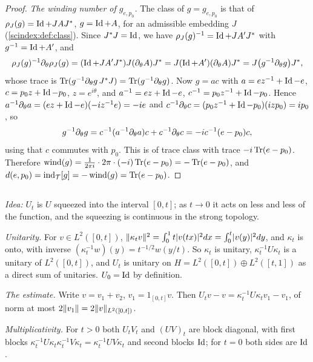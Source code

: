 \begin{proof}
  \emph{The winding number of $g_{e,p_0}$.} The class of $g=g_{e,p_0}$ is that of
  $\rho_J(g)=\operatorname{Id}+JAJ^*$, $g=\operatorname{Id}+A$, for an admissible embedding $J$
  (\cref{scindex:def:class}). Since $J^*J=\operatorname{Id}$, we have $\rho_J(g)^{-1}=\operatorname{Id}+JA'J^*$
  with $g^{-1}=\operatorname{Id}+A'$, and
  \begin{equation*}
    \rho_J(g)^{-1}\partial_\theta\rho_J(g)=(\operatorname{Id}+JA'J^*)J(\partial_\theta A)J^*=
    J(\operatorname{Id}+A')(\partial_\theta A)J^*=J\bigl(g^{-1}\partial_\theta g\bigr)J^*,
  \end{equation*}
  whose trace is $\operatorname{Tr}(g^{-1}\partial_\theta g\,J^*J)=\operatorname{Tr}(g^{-1}\partial_\theta g)$. Now
  $g=ac$ with $a=ez^{-1}+\operatorname{Id}-e$, $c=p_0z+\operatorname{Id}-p_0$, $z=e^{i\theta}$, and
  $a^{-1}=ez+\operatorname{Id}-e$, $c^{-1}=p_0z^{-1}+\operatorname{Id}-p_0$. Hence
  $a^{-1}\partial_\theta a=(ez+\operatorname{Id}-e)(-iz^{-1}e)=-ie$ and $c^{-1}\partial_\theta c=
  (p_0z^{-1}+\operatorname{Id}-p_0)(izp_0)=ip_0$, so
  \begin{equation*}
    g^{-1}\partial_\theta g=c^{-1}(a^{-1}\partial_\theta a)c+c^{-1}\partial_\theta c
    =-ic^{-1}(e-p_0)c,
  \end{equation*}
  using that $c$ commutes with $p_0$. This is of trace class with trace
  $-i\operatorname{Tr}(e-p_0)$. Therefore $\operatorname{wind}(g)=\frac1{2\pi i}\cdot2\pi\cdot(-i)\operatorname{Tr}(e-p_0)
  =-\operatorname{Tr}(e-p_0)$, and $d(e,p_0)=\operatorname{ind}_{\mathcal T}[g]=-\operatorname{wind}(g)=\operatorname{Tr}(e-p_0)$.
\end{proof}

\subsection*{}

\emph{Idea:} $U_t$ is $U$ squeezed into the interval $[0,t]$; as $t\to0$ it acts
on less and less of the function, and the squeezing is continuous in the strong
topology.

\emph{Unitarity.} For $v\in L^2([0,t])$,
$\lVert \kappa_tv\rVert^2=\int_0^1t\lvert v(tx)\rvert^2dx=\int_0^t\lvert v(y)\rvert^2dy$, and
$\kappa_t$ is onto, with inverse $(\kappa_t^{-1}w)(y)=t^{-1/2}w(y/t)$. So
$\kappa_t$ is unitary, $\kappa_t^{-1}U\kappa_t$ is a unitary of $L^2([0,t])$, and
$U_t$ is unitary on $H=L^2([0,t])\oplus L^2([t,1])$ as a direct sum of unitaries.
$U_0=\operatorname{Id}$ by definition.

\emph{The estimate.} Write $v=v_1+v_2$, $v_1=1_{[0,t]}v$. Then $U_tv-v=
\kappa_t^{-1}U\kappa_tv_1-v_1$, of norm at most $2\lVert v_1\rVert=2\lVert v\rVert_{L^2([0,t])}$.

\emph{Multiplicativity.} For $t>0$ both $U_tV_t$ and $(UV)_t$ are block diagonal,
with first blocks $\kappa_t^{-1}U\kappa_t\kappa_t^{-1}V\kappa_t=\kappa_t^{-1}UV\kappa_t$
and second blocks $\operatorname{Id}$; for $t=0$ both sides are $\operatorname{Id}$.

